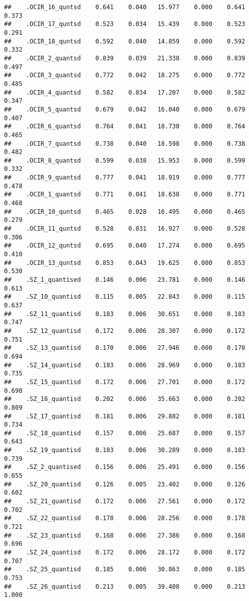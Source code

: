 \documentclass[]{article}
\begin{document}
\begin{verbatim}
##    .OCIR_16_quntsd    0.641    0.040   15.977    0.000    0.641    0.373
##    .OCIR_17_quntsd    0.523    0.034   15.439    0.000    0.523    0.291
##    .OCIR_18_quntsd    0.592    0.040   14.859    0.000    0.592    0.332
##    .OCIR_2_quantsd    0.839    0.039   21.338    0.000    0.839    0.497
##    .OCIR_3_quantsd    0.772    0.042   18.275    0.000    0.772    0.485
##    .OCIR_4_quantsd    0.582    0.034   17.207    0.000    0.582    0.347
##    .OCIR_5_quantsd    0.679    0.042   16.040    0.000    0.679    0.407
##    .OCIR_6_quantsd    0.764    0.041   18.730    0.000    0.764    0.465
##    .OCIR_7_quantsd    0.738    0.040   18.598    0.000    0.738    0.482
##    .OCIR_8_quantsd    0.599    0.038   15.953    0.000    0.599    0.332
##    .OCIR_9_quantsd    0.777    0.041   18.919    0.000    0.777    0.478
##    .OCIR_1_quantsd    0.771    0.041   18.638    0.000    0.771    0.468
##    .OCIR_10_quntsd    0.465    0.028   16.495    0.000    0.465    0.279
##    .OCIR_11_quntsd    0.528    0.031   16.927    0.000    0.528    0.306
##    .OCIR_12_quntsd    0.695    0.040   17.274    0.000    0.695    0.410
##    .OCIR_13_quntsd    0.853    0.043   19.625    0.000    0.853    0.530
##    .SZ_1_quantised    0.146    0.006   23.781    0.000    0.146    0.613
##    .SZ_10_quantisd    0.115    0.005   22.843    0.000    0.115    0.637
##    .SZ_11_quantisd    0.183    0.006   30.651    0.000    0.183    0.747
##    .SZ_12_quantisd    0.172    0.006   28.307    0.000    0.172    0.751
##    .SZ_13_quantisd    0.170    0.006   27.946    0.000    0.170    0.694
##    .SZ_14_quantisd    0.183    0.006   28.969    0.000    0.183    0.735
##    .SZ_15_quantisd    0.172    0.006   27.701    0.000    0.172    0.690
##    .SZ_16_quantisd    0.202    0.006   35.663    0.000    0.202    0.809
##    .SZ_17_quantisd    0.181    0.006   29.882    0.000    0.181    0.734
##    .SZ_18_quantisd    0.157    0.006   25.687    0.000    0.157    0.643
##    .SZ_19_quantisd    0.183    0.006   30.289    0.000    0.183    0.739
##    .SZ_2_quantised    0.156    0.006   25.491    0.000    0.156    0.655
##    .SZ_20_quantisd    0.126    0.005   23.402    0.000    0.126    0.602
##    .SZ_21_quantisd    0.172    0.006   27.561    0.000    0.172    0.702
##    .SZ_22_quantisd    0.178    0.006   28.256    0.000    0.178    0.721
##    .SZ_23_quantisd    0.168    0.006   27.386    0.000    0.168    0.696
##    .SZ_24_quantisd    0.172    0.006   28.172    0.000    0.172    0.707
##    .SZ_25_quantisd    0.185    0.006   30.863    0.000    0.185    0.753
##    .SZ_26_quantisd    0.213    0.005   39.408    0.000    0.213    1.000

\end{verbatim}
\end{document}
